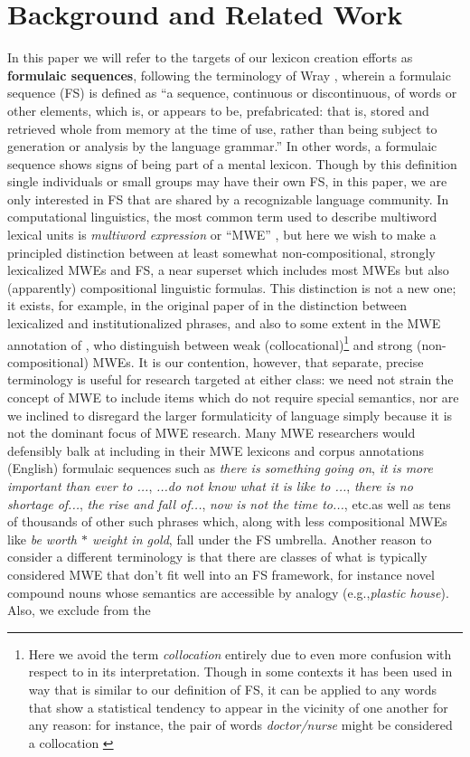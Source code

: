 \documentclass[11pt,letterpaper]{article}
\makeatletter
\def \eg {e.g.,\@ }
\def \etc {etc.\@ }
\newcommand{\dotts}{...}
\newcommand{\gap}{$*$\xspace}
\newcommand{\ex}[1]{\textit{#1}\xspace}
\newcommand{\termdef}[1]{\textbf{#1}\xspace}
\makeatother
\begin{document}
\section{Background and Related Work}

In this paper we will refer to the targets of our lexicon creation efforts as \termdef{formulaic sequences}, following the terminology of Wray , wherein a formulaic sequence (FS) is defined as ``a sequence, continuous or discontinuous, of words or other elements, which is, or appears to be, prefabricated: that is, stored and retrieved whole from memory at the time of use, rather than being subject to generation or analysis by the language grammar.'' In other words, a formulaic sequence shows signs of being part of a mental lexicon. Though by this definition single individuals or small groups may have their own FS, in this paper, we are only interested in FS that are shared by a recognizable language community. In computational linguistics, the most common term used to describe multiword lexical units is \emph{multiword expression} or ``MWE'' \cite{Sag02,Baldwin10}, but here we wish to make a principled distinction between at least somewhat non-compositional, strongly lexicalized MWEs and FS, a near superset which includes most MWEs but also (apparently) compositional linguistic formulas. This distinction is not a new one; it exists, for example, in the original paper of  in the distinction between lexicalized and institutionalized phrases, and also to some extent in the MWE annotation of , who distinguish between weak (collocational)\footnote{Here we avoid the term \emph{collocation} entirely due to even more confusion with respect to in its interpretation. Though in some contexts it has been used in way that is similar to our definition of FS, it can be applied to any words that show a statistical tendency to appear in the vicinity of one another for any reason: for instance, the pair of words \ex{doctor/nurse} might be considered a collocation \cite{Ramisch14}}  and strong (non-compositional) MWEs. It is our contention, however, that separate, precise terminology is useful for research targeted at either class: we need not strain the concept of MWE to include items which do not require special semantics, nor are we inclined to disregard the larger formulaticity of language simply because it is not the dominant focus of MWE research. Many MWE researchers would defensibly balk at including in their MWE lexicons and corpus annotations (English) formulaic sequences such as \ex{there is something going on}, \ex{it is more important than ever to \dotts}, \ex{\dotts do not know what it is like to \dotts}, \ex{there is no shortage of\dotts}, \ex{the rise and fall of\dotts}, \ex{now is not the time to\dotts}, \etc as well as tens of thousands of other such phrases which, along with less compositional MWEs like \ex{be worth \gap weight in gold}, fall under the FS umbrella. Another reason to consider a different terminology is that there are classes of what is typically considered MWE that don't fit well into an FS framework, for instance novel compound nouns whose semantics are accessible by analogy (\eg \ex{plastic house}). Also, we exclude from the 
\end{document}
